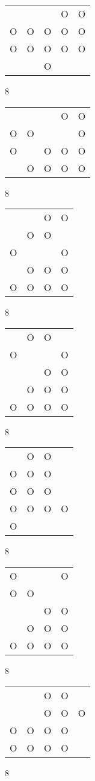 \begin{tabular}{|m{0.2cm}m{0.2cm}m{0.2cm}m{0.2cm}m{0.2cm}|}\hline
 & & &O&O\\
O&O&O&O&O\\
O&O&O&O&O\\
 & &O& & \\
\hline\end{tabular}8
\begin{tabular}{|m{0.2cm}m{0.2cm}m{0.2cm}m{0.2cm}m{0.2cm}|}\hline
 & & &O&O\\
O&O& & &O\\
O& &O&O&O\\
 &O&O&O&O\\
\hline\end{tabular}8
\begin{tabular}{|m{0.2cm}m{0.2cm}m{0.2cm}m{0.2cm}|}\hline
 & &O&O\\
 &O&O& \\
O& & &O\\
 &O&O&O\\
O&O&O&O\\
\hline\end{tabular}8
\begin{tabular}{|m{0.2cm}m{0.2cm}m{0.2cm}m{0.2cm}|}\hline
 &O&O& \\
O& & &O\\
 & &O&O\\
 &O&O&O\\
O&O&O&O\\
\hline\end{tabular}8
\begin{tabular}{|m{0.2cm}m{0.2cm}m{0.2cm}m{0.2cm}|}\hline
 &O&O& \\
O&O&O& \\
O&O&O& \\
O&O&O&O\\
O& & & \\
\hline\end{tabular}8
\begin{tabular}{|m{0.2cm}m{0.2cm}m{0.2cm}m{0.2cm}|}\hline
O& & &O\\
O&O& & \\
 & &O&O\\
 &O&O&O\\
O&O&O&O\\
\hline\end{tabular}8
\begin{tabular}{|m{0.2cm}m{0.2cm}m{0.2cm}m{0.2cm}m{0.2cm}|}\hline
 & &O&O& \\
 & &O&O&O\\
O&O&O&O& \\
O&O&O&O& \\
\hline\end{tabular}8
